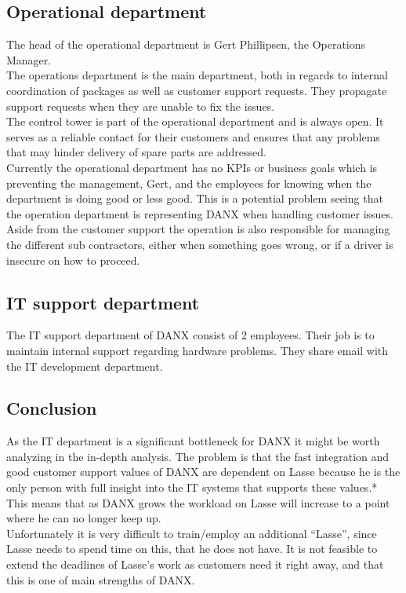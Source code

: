\subsection{Operational department}
The head of the operational department is Gert Phillipsen, the Operations Manager.\\
 
The operations department is the main department, both in regards to internal coordination of packages as well as customer support requests. They propagate support requests when they are unable to fix the issues.\\
The control tower is part of the operational department and is always open. It serves as a reliable contact for their customers and ensures that any problems that may hinder delivery of spare parts are addressed.\\
Currently the operational department has no KPIs or business goals which is preventing the management, Gert, and the employees for knowing when the department is doing good or less good. This is a potential problem seeing that the operation department is representing DANX when handling customer issues.\\
Aside from the customer support the operation is also responsible for managing the different sub contractors, either when something goes wrong, or if a driver is insecure on how to proceed. 

\subsection{IT support department}
The IT support department of DANX consist of 2 employees. Their job is to maintain internal support regarding hardware problems. They share email with the IT development department.

\subsection{Conclusion}
As the IT department is a significant bottleneck for DANX it might be worth analyzing in the in-depth analysis. The problem is that the fast integration and good customer support values of DANX are dependent on Lasse because he is the only person with full insight into the IT systems that supports these values.* This means that as DANX grows the workload on Lasse will increase to a point where he can no longer keep up.\\
Unfortunately it is very difficult to train/employ an additional “Lasse”, since Lasse needs to spend time on this, that he does not have. It is not feasible to extend the deadlines of Lasse’s work as customers need it right away, and that this is one of main strengths of DANX.